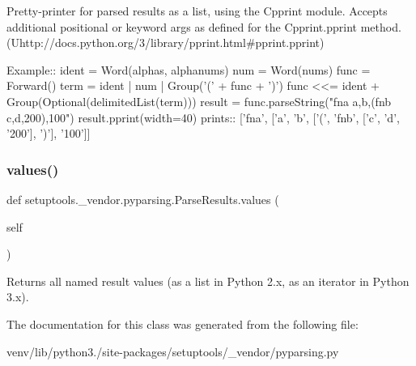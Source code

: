 \begin{DoxyVerb}Pretty-printer for parsed results as a list, using the C{pprint} module.
Accepts additional positional or keyword args as defined for the 
C{pprint.pprint} method. (U{http://docs.python.org/3/library/pprint.html#pprint.pprint})

Example::
    ident = Word(alphas, alphanums)
    num = Word(nums)
    func = Forward()
    term = ident | num | Group('(' + func + ')')
    func <<= ident + Group(Optional(delimitedList(term)))
    result = func.parseString("fna a,b,(fnb c,d,200),100")
    result.pprint(width=40)
prints::
    ['fna',
     ['a',
      'b',
      ['(', 'fnb', ['c', 'd', '200'], ')'],
      '100']]
\end{DoxyVerb}
 \mbox{\label{classsetuptools_1_1__vendor_1_1pyparsing_1_1_parse_results_afdbaeb8462d5a1d91956b9e25adcff0b}} 
\subsubsection{\texorpdfstring{values()}{values()}}
{\footnotesize\ttfamily def setuptools.\+\_\+vendor.\+pyparsing.\+Parse\+Results.\+values (\begin{DoxyParamCaption}\item[{}]{self }\end{DoxyParamCaption})}

\begin{DoxyVerb}Returns all named result values (as a list in Python 2.x, as an iterator in Python 3.x).\end{DoxyVerb}
 

The documentation for this class was generated from the following file\+:\begin{DoxyCompactItemize}
\item 
venv/lib/python3./site-\/packages/setuptools/\+\_\+vendor/pyparsing.\+py\end{DoxyCompactItemize}
